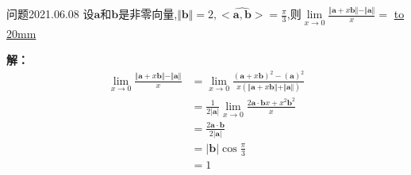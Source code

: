 \begin{mybox}{问题2021.06.08}
	\qquad 设$\boldsymbol{a}$和$\boldsymbol{b}$是非零向量,$\Vert \boldsymbol{b} \Vert=2,<\hat{\boldsymbol{a},\boldsymbol{b}}>=\frac{\pi}{3}$,则$\lim\limits_{x\to 0} \frac{\Vert \boldsymbol{a} +x\boldsymbol{b} \Vert -\Vert \boldsymbol{a} \Vert}{x}=$
\underline{\hbox to 20mm{}}
\end{mybox}	
\noindent
\textbf{解：}
\begin{align*}
	\lim\limits_{x\to 0} \frac{\Vert \boldsymbol{a} +x\boldsymbol{b} \Vert -\Vert \boldsymbol{a} \Vert}{x}&=\lim\limits_{x\to 0} \frac{(\boldsymbol{a} +x\boldsymbol{b})^{2} -(\boldsymbol{a})^2}{x(\Vert \boldsymbol{a} +x\boldsymbol{b} \Vert +\Vert \boldsymbol{a} \Vert)}\\
	&=\frac{1}{2\left|\boldsymbol{a} \right|} \lim\limits_{x\to 0} \frac{2\boldsymbol{a}\cdot \boldsymbol{b}x+x^2 \boldsymbol{b}^2}{x}\\
	&=\frac{2\boldsymbol{a}\cdot \boldsymbol{b}}{2\left|\boldsymbol{a} \right|}\\
	&=\left|\boldsymbol{b}\right| \cos \frac{\pi}{3}\\
	&=1
\end{align*}